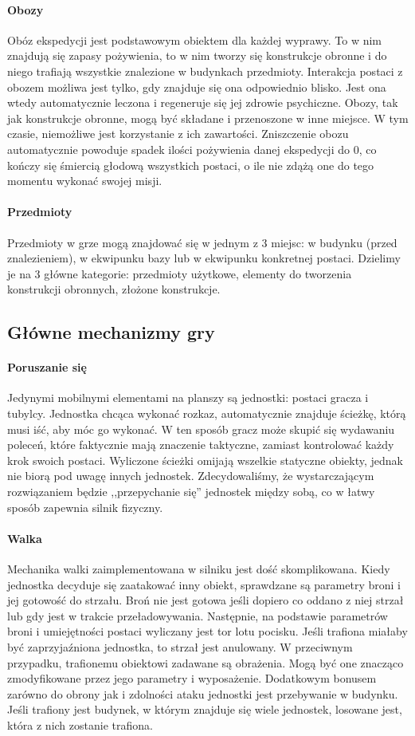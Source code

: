 \documentclass[licencjacka]{pracamgr}
\begin{document}
      \paragraph{Obozy}
	Obóz ekspedycji jest podstawowym obiektem dla każdej wyprawy. To w nim znajdują się zapasy pożywienia, to w nim tworzy
	się konstrukcje obronne i do niego trafiają wszystkie znalezione w budynkach przedmioty. Interakcja postaci z obozem
	możliwa jest tylko, gdy znajduje się ona odpowiednio blisko. Jest ona wtedy automatycznie leczona i regeneruje się
	jej zdrowie psychiczne. Obozy, tak jak konstrukcje obronne, mogą być składane i przenoszone w inne miejsce. W tym czasie,
	niemożliwe jest korzystanie z ich zawartości. Zniszczenie obozu automatycznie powoduje spadek ilości pożywienia danej
	ekspedycji do 0, co kończy się śmiercią głodową wszystkich postaci, o ile nie zdążą one do tego momentu wykonać swojej misji.
      \paragraph{Przedmioty}
	Przedmioty w grze mogą znajdować się w jednym z 3 miejsc: w budynku (przed znalezieniem), w ekwipunku bazy lub w
	ekwipunku konkretnej postaci. Dzielimy je na 3 główne kategorie: przedmioty użytkowe, elementy do tworzenia konstrukcji
	obronnych, złożone konstrukcje.

    \subsection{Główne mechanizmy gry}
      \paragraph{Poruszanie się}
	Jedynymi mobilnymi elementami na planszy są jednostki: postaci gracza i tubylcy. Jednostka chcąca wykonać rozkaz, automatycznie znajduje
	ścieżkę, którą musi iść, aby móc go wykonać. W ten sposób gracz może skupić się wydawaniu poleceń, które faktycznie mają
	znaczenie taktyczne, zamiast kontrolować każdy krok swoich postaci. Wyliczone ścieżki omijają wszelkie statyczne obiekty, jednak
	nie biorą pod uwagę innych jednostek. Zdecydowaliśmy, że wystarczającym rozwiązaniem będzie ,,przepychanie się'' jednostek między sobą,
	co w łatwy sposób zapewnia silnik fizyczny.
      \paragraph{Walka}
	Mechanika walki zaimplementowana w silniku jest dość skomplikowana. Kiedy jednostka decyduje się zaatakować inny obiekt,
	sprawdzane są parametry broni i jej gotowość do strzału. Broń nie jest gotowa jeśli dopiero co oddano z niej strzał lub gdy
	jest w trakcie przeładowywania. Następnie, na podstawie parametrów broni i umiejętności postaci wyliczany jest tor lotu pocisku.
	Jeśli trafiona miałaby być zaprzyjaźniona jednostka, to strzał jest anulowany. W przeciwnym przypadku, trafionemu obiektowi zadawane są
	obrażenia. Mogą być one znacząco zmodyfikowane przez jego parametry i wyposażenie. Dodatkowym bonusem zarówno do obrony jak i zdolności
	ataku jednostki jest przebywanie w budynku. Jeśli trafiony jest budynek, w którym znajduje się wiele jednostek, losowane jest, która z nich
	zostanie trafiona.
\end{document}
